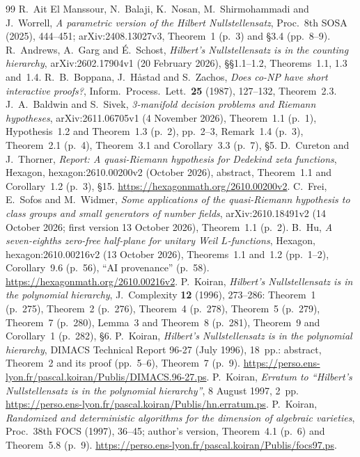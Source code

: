 \documentclass[11pt]{amsart}
\theoremstyle{definition}
\theoremstyle{remark}
\begin{document}
\begin{thebibliography}{99}
 R.~Ait El Manssour, N.~Balaji, K.~Nosan, M.~Shirmohammadi and J.~Worrell, \emph{A parametric version of the Hilbert Nullstellensatz}, Proc.\ 8th SOSA (2025), 444--451; arXiv:2408.13027v3, Theorem~1 (p.~3) and \S3.4 (pp.~8--9).
 R.~Andrews, A.~Garg and \'E.~Schost, \emph{Hilbert's Nullstellensatz is in the counting hierarchy}, arXiv:2602.17904v1 (20 February 2026), \S\S1.1--1.2, Theorems~1.1, 1.3 and~1.4.
 R.~B.~Boppana, J.~H\aa stad and S.~Zachos, \emph{Does co-NP have short interactive proofs?}, Inform.\ Process.\ Lett.\ \textbf{25} (1987), 127--132, Theorem~2.3.
 J.~A.~Baldwin and S.~Sivek, \emph{3-manifold decision problems and Riemann hypotheses}, arXiv:2611.06705v1 (4 November 2026), Theorem~1.1 (p.~1), Hypothesis~1.2 and Theorem~1.3 (p.~2), pp.~2--3, Remark~1.4 (p.~3), Theorem~2.1 (p.~4), Theorem~3.1 and Corollary~3.3 (p.~7), \S5.
 D.~Cureton and J.~Thorner, \emph{Report: A quasi-Riemann hypothesis for Dedekind zeta functions}, Hexagon, hexagon:2610.00200v2 (October 2026), abstract, Theorem~1.1 and Corollary~1.2 (p.~3), \S15. \url{https://hexagonmath.org/2610.00200v2}.
 C.~Frei, E.~Sofos and M.~Widmer, \emph{Some applications of the quasi-Riemann hypothesis to class groups and small generators of number fields}, arXiv:2610.18491v2 (14 October 2026; first version 13 October 2026), Theorem~1.1 (p.~2).
 B.~Hu, \emph{A seven-eighths zero-free half-plane for unitary Weil $L$-functions}, Hexagon, hexagon:2610.00216v2 (13 October 2026), Theorems~1.1 and~1.2 (pp.~1--2), Corollary~9.6 (p.~56), ``AI provenance'' (p.~58). \url{https://hexagonmath.org/2610.00216v2}.
 P.~Koiran, \emph{Hilbert's Nullstellensatz is in the polynomial hierarchy}, J.~Complexity \textbf{12} (1996), 273--286: Theorem~1 (p.~275), Theorem~2 (p.~276), Theorem~4 (p.~278), Theorem~5 (p.~279), Theorem~7 (p.~280), Lemma~3 and Theorem~8 (p.~281), Theorem~9 and Corollary~1 (p.~282), \S6.
 P.~Koiran, \emph{Hilbert's Nullstellensatz is in the polynomial hierarchy}, DIMACS Technical Report 96-27 (July 1996), 18~pp.: abstract, Theorem~2 and its proof (pp.~5--6), Theorem~7 (p.~9). \url{https://perso.ens-lyon.fr/pascal.koiran/Publis/DIMACS.96-27.ps}.
 P.~Koiran, \emph{Erratum to ``Hilbert's Nullstellensatz is in the polynomial hierarchy''}, 8 August 1997, 2~pp. \url{https://perso.ens-lyon.fr/pascal.koiran/Publis/hn.erratum.ps}.
 P.~Koiran, \emph{Randomized and deterministic algorithms for the dimension of algebraic varieties}, Proc.\ 38th FOCS (1997), 36--45; author's version, Theorem~4.1 (p.~6) and Theorem~5.8 (p.~9). \url{https://perso.ens-lyon.fr/pascal.koiran/Publis/focs97.ps}.

\end{thebibliography}
\end{document}
